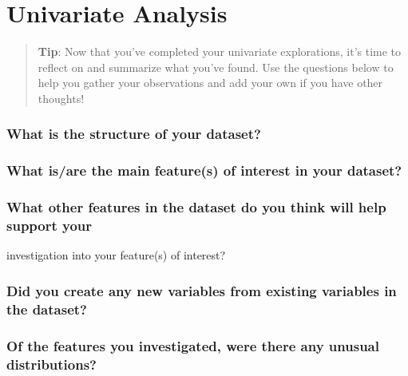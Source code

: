 \documentclass[]{article}
\begin{document}
\hypertarget{univariate-analysis}{%
\section{Univariate Analysis}\label{univariate-analysis}}

\begin{quote}
\textbf{Tip}: Now that you've completed your univariate explorations,
it's time to reflect on and summarize what you've found. Use the
questions below to help you gather your observations and add your own if
you have other thoughts!
\end{quote}

\hypertarget{what-is-the-structure-of-your-dataset}{%
\subsubsection{What is the structure of your
dataset?}\label{what-is-the-structure-of-your-dataset}}

\hypertarget{what-isare-the-main-features-of-interest-in-your-dataset}{%
\subsubsection{What is/are the main feature(s) of interest in your
dataset?}\label{what-isare-the-main-features-of-interest-in-your-dataset}}

\hypertarget{what-other-features-in-the-dataset-do-you-think-will-help-support-your}{%
\subsubsection{\texorpdfstring{What other features in the dataset do you
think will help support your\\
}{What other features in the dataset do you think will help support your }}\label{what-other-features-in-the-dataset-do-you-think-will-help-support-your}}

investigation into your feature(s) of interest?

\hypertarget{did-you-create-any-new-variables-from-existing-variables-in-the-dataset}{%
\subsubsection{Did you create any new variables from existing variables
in the
dataset?}\label{did-you-create-any-new-variables-from-existing-variables-in-the-dataset}}

\hypertarget{of-the-features-you-investigated-were-there-any-unusual-distributions}{%
\subsubsection{\texorpdfstring{Of the features you investigated, were
there any unusual distributions?\\
}{Of the features you investigated, were there any unusual distributions? }}\label{of-the-features-you-investigated-were-there-any-unusual-distributions}}
\end{document}
